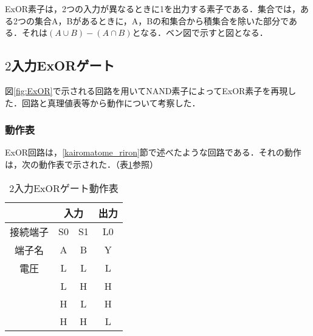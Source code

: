 ExOR素子は，2つの入力が異なるときに1を出力する素子である．集合では，ある2つの集合A，Bがあるときに，A，Bの和集合から積集合を除いた部分である．それは$(A\cup B)-(A\cap B)$となる．ベン図で示すと図となる．

%
%
%
\subsection{$2$入力ExORゲート}
\label{experiment_ExOR}
図\ref{fig:ExOR}で示される回路を用いてNAND素子によってExOR素子を再現した．回路と真理値表等から動作について考察した．

\subsubsection{動作表}
\label{ExOR_moment}
ExOR回路は，\ref{kairomatome_riron}節で述べたような回路である．それの動作は，次の動作表で示された．（表\ref{tab:exor_momenttab}参照）

\begin {table}[ht]
	\begin {center}
		\caption {2入力ExORゲート動作表}%
		\begin {tabular}{c|cc|c}\hline
			\multicolumn{1}{c|}{}&%
			\multicolumn{2}{c}{入力}&%
			\multicolumn{1}{|c}{出力}\\ %
			\hline
			\multicolumn{1}{c|}{接続端子}&%
			\multicolumn{1}{c}{S0}&%
			\multicolumn{1}{c}{S1}&%
			\multicolumn{1}{|c}{L0}\\ %
			\multicolumn{1}{c|}{端子名}&%
			\multicolumn{1}{c}{A}&%
			\multicolumn{1}{c}{B}&%
			\multicolumn{1}{|c}{Y}\\ %
			\hline
			電圧&L&L&L\\%
			&L&H&H\\%
			&H&L&H\\%
			&H&H&L\\
			\hline
		\end{tabular}
		\label {tab:exor_momenttab}%
	\end{center}
\end{table}

